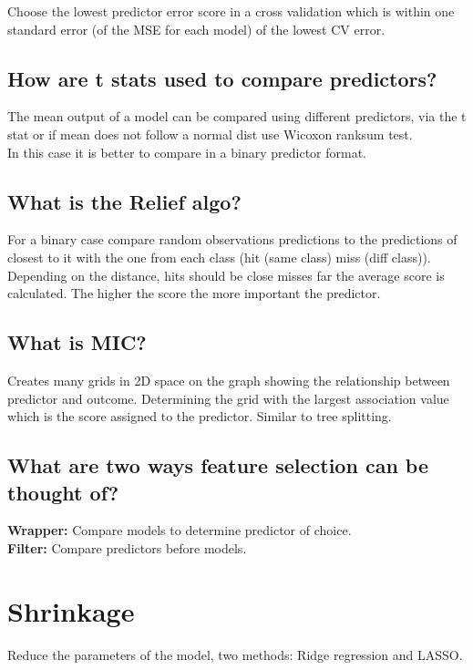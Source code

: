 \documentclass[11pt]{scrartcl} %
\begin{document}
Choose the lowest predictor error score in a cross validation which is within one standard error (of the MSE for each model)
of the lowest CV error.

\subsection{How are t stats used to compare predictors?}

The mean output of a model can be compared using different predictors, via the t stat or if mean does not
follow a normal dist use Wicoxon ranksum test.\\

In this case it is better to compare in a binary predictor format.

\subsection{What is the Relief algo?}

For a binary case compare random observations predictions to the predictions of closest to it with the
one from each class (hit (same class) miss (diff class)). Depending on the distance, hits should be close
misses far the average score is calculated. The higher the score the more important the predictor.

\subsection{What is MIC?}

Creates many grids in 2D space on the graph showing the relationship between predictor and outcome. Determining the
grid with the largest association value which is the score assigned to the predictor. Similar to tree splitting.

\subsection{What are two ways feature selection can be thought of?}

\textbf{Wrapper:} Compare models to determine predictor of choice.\\
\textbf{Filter:} Compare predictors before models.

\section{Shrinkage}

Reduce the parameters of the model, two methods: Ridge regression and LASSO.
\end{document}
